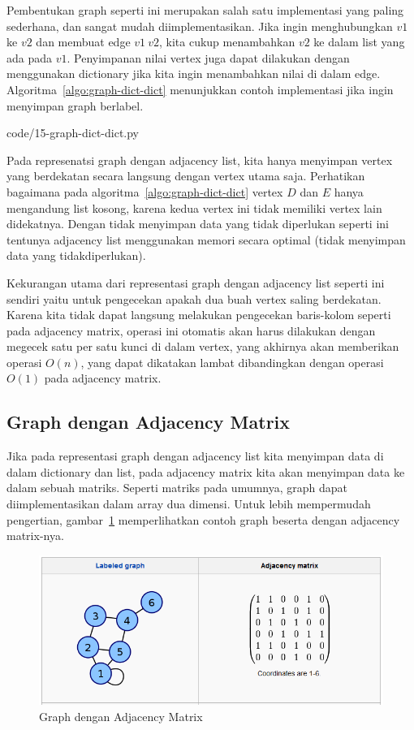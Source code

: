 Pembentukan graph seperti ini merupakan salah satu implementasi yang paling sederhana, dan sangat mudah diimplementasikan. Jika ingin menghubungkan $v1$ ke $v2$ dan membuat edge $v1 ~ v2$, kita cukup menambahkan $v2$ ke dalam list yang ada pada $v1$. Penyimpanan nilai vertex juga dapat dilakukan dengan menggunakan dictionary jika kita ingin menambahkan nilai di dalam edge. Algoritma~\ref{algo:graph-dict-dict} menunjukkan contoh implementasi jika ingin menyimpan graph berlabel.


                {code/15-graph-dict-dict.py}

Pada represenatsi graph dengan adjacency list, kita hanya menyimpan vertex yang berdekatan secara langsung dengan vertex utama saja. Perhatikan bagaimana pada algoritma~\ref{algo:graph-dict-dict} vertex $D$ dan $E$ hanya mengandung list kosong, karena kedua vertex ini tidak memiliki vertex lain didekatnya. Dengan tidak menyimpan data yang tidak diperlukan seperti ini tentunya adjacency list menggunakan memori secara optimal (tidak menyimpan data yang tidakdiperlukan).

Kekurangan utama dari representasi graph dengan adjacency list seperti ini sendiri yaitu untuk pengecekan apakah dua buah vertex saling berdekatan. Karena kita tidak dapat langsung melakukan pengecekan baris-kolom seperti pada adjacency matrix, operasi ini otomatis akan harus dilakukan dengan megecek satu per satu kunci di dalam vertex, yang akhirnya akan memberikan operasi $O(n)$, yang dapat dikatakan lambat dibandingkan dengan operasi $O(1)$ pada adjacency matrix.

\subsection{Graph dengan Adjacency Matrix}

Jika pada representasi graph dengan adjacency list kita menyimpan data di dalam dictionary dan list, pada adjacency matrix kita akan menyimpan data ke dalam sebuah matriks. Seperti matriks pada umumnya, graph dapat diimplementasikan dalam array dua dimensi. Untuk lebih mempermudah pengertian, gambar~\ref{fig:graph-adj-matrix} memperlihatkan contoh graph beserta dengan adjacency matrix-nya.

\begin{figure}
    \centering
    \includegraphics[width=\textwidth,keepaspectratio]{fig/Graph-AdjacencyMatrix.png}%
	\caption{Graph dengan Adjacency Matrix}%
	\label{fig:graph-adj-matrix}%
\end{figure}

